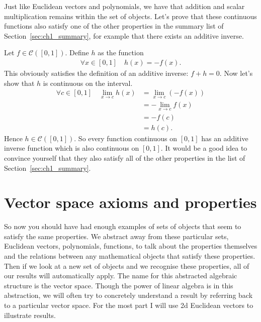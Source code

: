 Just like Euclidean vectors and polynomials, we have that addition and scalar multiplication remains within the set of objects. Let's prove that these continuous functions also satisfy one of the other properties in the summary list of Section~\ref{sec:ch1_summary}, for example that there exists an additive inverse.

Let $f\in\mathcal{C}([0,1])$. Define $h$ as the function
\begin{align*}
\forall x\in[0,1] \quad h(x) = -f(x).
\end{align*}
This obviously satisfies the definition of an additive inverse: $f + h = 0$. Now let's show that $h$ is continuous on the interval.
\begin{align*}
\forall c\in [0,1] \quad \lim_{x \to c} h(x) &= \lim_{x \to c} \left(-f(x)\right) \\
 &= - \lim_{x \to c} f(x) \\
 &= - f(c) \\
 &= h(c).
\end{align*}
Hence $h\in\mathcal{C}([0,1])$. So every function continuous on $[0,1]$ has an additive inverse function which is also continuous on $[0,1]$. It would be a good idea to convince yourself that they also satisfy all of the other properties in the list of Section~\ref{sec:ch1_summary}.


\section{Vector space axioms and properties}

So now you should have had enough examples of sets of objects that seem to satisfy the same properties. We abstract away from these particular sets, Euclidean vectors, polynomials, functions, to talk about the properties themselves and the relations between any mathematical objects that satisfy these properties. Then if we look at a new set of objects and we recognise these properties, all of our results will automatically apply. The name for this abstracted algebraic structure is the vector space. Though the power of linear algebra is in this abstraction, we will often try to concretely understand a result by referring back to a particular vector space. For the most part I will use 2d Euclidean vectors to illustrate results.

